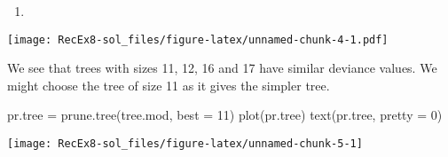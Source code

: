 \documentclass[
]{article}
\newenvironment{Shaded}{\begin{snugshade}}{\end{snugshade}}
\newcommand{\AttributeTok}[1]{\textcolor[rgb]{0.77,0.63,0.00}{#1}}
\newcommand{\DecValTok}[1]{\textcolor[rgb]{0.00,0.00,0.81}{#1}}
\newcommand{\FunctionTok}[1]{\textcolor[rgb]{0.00,0.00,0.00}{#1}}
\newcommand{\NormalTok}[1]{#1}
\newcommand{\OtherTok}[1]{\textcolor[rgb]{0.56,0.35,0.01}{#1}}
\newcommand{\SpecialCharTok}[1]{\textcolor[rgb]{0.00,0.00,0.00}{#1}}
\newcommand{\StringTok}[1]{\textcolor[rgb]{0.31,0.60,0.02}{#1}}
\providecommand{\tightlist}{%
  \setlength{\itemsep}{0pt}\setlength{\parskip}{0pt}}
\begin{document}
\begin{enumerate}
\def\labelenumi{\alph{enumi})}
\setcounter{enumi}{2}
\tightlist
\item
\end{enumerate}

\begin{Shaded}
\end{Shaded}

\texttt{[image: RecEx8-sol\_files/figure-latex/unnamed-chunk-4-1.pdf]}

We see that trees with sizes 11, 12, 16 and 17 have similar deviance
values. We might choose the tree of size 11 as it gives the simpler
tree.

\begin{Shaded}
\begin{Highlighting}[]
\NormalTok{pr.tree }\OtherTok{=} \FunctionTok{prune.tree}\NormalTok{(tree.mod, }\AttributeTok{best =} \DecValTok{11}\NormalTok{)}
\FunctionTok{plot}\NormalTok{(pr.tree)}
\FunctionTok{text}\NormalTok{(pr.tree, }\AttributeTok{pretty =} \DecValTok{0}\NormalTok{)}
\end{Highlighting}
\end{Shaded}

\texttt{[image: RecEx8-sol\_files/figure-latex/unnamed-chunk-5-1]}

\begin{Shaded}
\end{Shaded}
\end{document}
